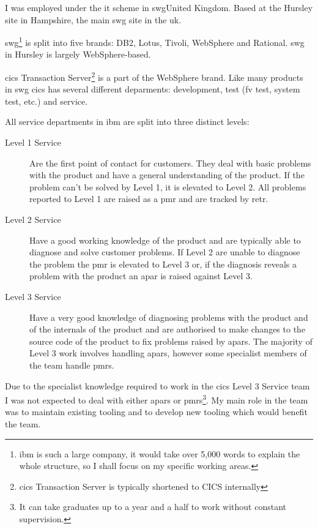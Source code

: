 \documentclass[a4paper,11pt]{report}
\begin{document}
I was employed under the \gls{it} scheme in \gls{swg}{United Kingdom}. Based at the Hursley site in 
Hampshire, the main \gls{swg} site in the \gls{uk}.

\Gls{swg}\footnote{\gls{ibm} is such a large company, it would take over 5,000 words to explain the
whole structure, so I shall focus on my specific working areas.} is split into five brands: DB2, 
Lotus, Tivoli, WebSphere and Rational. \Gls{swg} in Hursley is largely WebSphere-based.

\Gls{cics} Transaction Server\footnote{\Gls{cics} Transaction Server is typically shortened to CICS
internally} is a part of the WebSphere brand. Like many products in \gls{swg} \gls{cics} has 
several different deparments: development, test (\gls{fv} test, system test, etc.) and service.

All service departments in \gls{ibm} are split into three distinct levels:

\begin{description}
\item[Level 1 Service] Are the first point of contact for customers. They deal with basic problems
with the product and have a general understanding of the product. If the problem can't be solved by
Level 1, it is elevated to Level 2. All problems reported to Level 1 are raised as a \gls{pmr} and
are tracked by \gls{retr}.
\item[Level 2 Service] Have a good working knowledge of the product and are typically able to 
diagnose and solve customer problems. If Level 2 are unable to diagnose the problem the \gls{pmr}
is elevated to Level 3 or, if the diagnosis reveals a problem with the product an \gls{apar} is
raised against Level 3. 
\item[Level 3 Service] Have a very good knowledge of diagnosing problems with the product and of
the internals of the product and are authorised to make changes to the source code of the product
to fix problems raised by \gls{apar}s. The majority of Level 3 work involves handling \gls{apar}s,
however some specialist members of the team handle \gls{pmr}s.
\end{description}

Due to the specialist knowledge required to work in the \gls{cics} Level 3 Service team I was not
expected to deal with either \gls{apar}s or \gls{pmr}s\footnote{It can take graduates up to a year
and a half to work without constant supervision.}. My main role in the team was to maintain 
existing tooling and to develop new tooling which would benefit the team.
\end{document}
